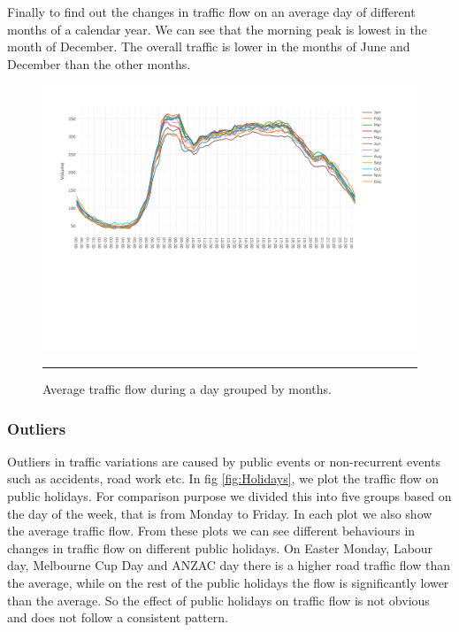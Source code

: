 Finally to find out the changes in traffic flow on an average day of different months of a calendar
year. We can see that the morning peak is lowest in the month of December. The overall traffic
is lower in the months of June and December than the other months.

\begin{figure}[h]
    \centering
    \includegraphics[width=\textwidth,height=\textheight,keepaspectratio]{Plots/variation-months.pdf}
    \rule{35em}{0.5pt}
  \caption[Average traffic flow during a day grouped by months]{Average traffic flow during a day
  grouped by months.}
  \label{fig:MonthlyVariations}
\end{figure}


\subsubsection{Outliers}
Outliers in traffic variations are caused by public events or non-recurrent events such as accidents,
road work etc.  In fig \ref{fig:Holidays}, we plot the traffic flow on public holidays. For comparison
purpose we divided this into five groups based on the day of the week, that is from Monday to Friday.
In each plot we also show the average traffic flow. From these plots we can see different behaviours
in changes in traffic flow on different public holidays. On Easter Monday, Labour day,
Melbourne Cup Day and ANZAC day there is a higher road traffic flow than the average, while on the
rest of the public holidays the flow is significantly lower than the average. So the effect of
public holidays on traffic flow is not obvious and does not follow a consistent pattern.


